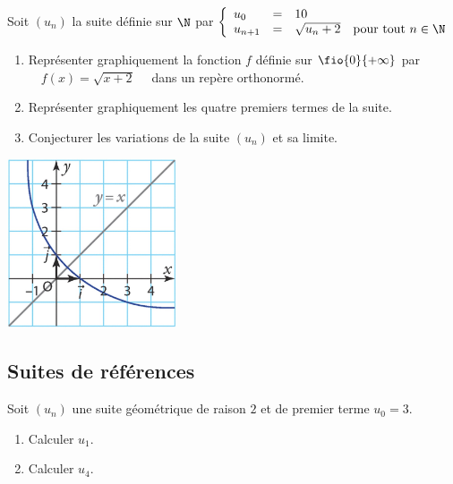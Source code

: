 \documentclass[a4paper,11pt,exos]{nsi} %
\begin{document}
\exo{}
\tabdefault
Soit $(u_n)$ la suite définie sur $\N$ par $\left\{
		\begin{array}{llll}
			u_0 & = & 10 & \\
			u_{n+1} & = & \sqrt{u_n+2} & \text{pour tout } n\in\N\\
		\end{array}
    \right. $
\begin{enumerate}
    \item Représenter graphiquement la fonction $f$ définie sur $\fio{0}{+\infty}$ par $\quad f(x)=\sqrt{x+2}\quad$ dans un repère orthonormé.
    \item Représenter graphiquement les quatre premiers termes de la suite.
    \item Conjecturer les variations de la suite $(u_n)$ et sa limite.
\end{enumerate}

\exo{}
{\includegraphics[width=5cm]{graphique1.jpg}}


\subsection*{Suites de références}

\exo{}
Soit $(u_n)$ une suite géométrique de raison $2$ et de premier terme $u_0=3$.
\begin{multicols}{2}
\begin{enumerate}
    \item Calculer $u_1$.
    \item Calculer $u_4$.
\end{enumerate}
\end{multicols}
\end{document}
